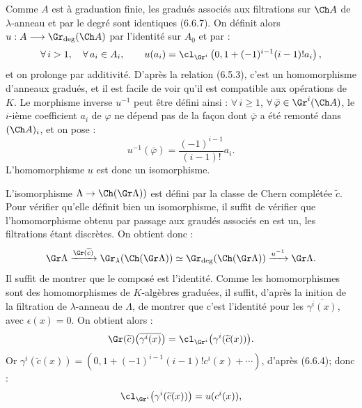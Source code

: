 
Comme \(A\) est à graduation finie, les gradués associés aux filtrations sur \(\Ch A\) de \(\lambda\)-anneau et par le degré sont identiques (6.6.7). On définit alors \(u:A\longrightarrow \Gr_{\deg}(\Ch A)\) par l'identité sur \(A_0\) et par :
\[
  \forall\, i>1,\quad\forall\, a_i\in A_i,\qquad u(a_i)=\cl_{\Gr^i}\left(0,1+(-1)^{i-1}(i-1)!a_i\right),
\]
et on prolonge par additivité. D'après la relation (6.5.3), c'est un homomorphisme d'anneaux gradués, et il est facile de voir qu'il est compatible aux opérations de \(K\). Le morphisme inverse \(u^{-1}\) peut être défini ainsi : \(\forall\, i\ge1\), \(\forall\,\bar\varphi\in\Gr^i(\Ch A)\), le \(i\)-ième coefficient \(a_i\) de \(\varphi\) ne dépend pas de la façon dont \(\bar\varphi\) a été remonté dans \((\Ch A)_i\), et on pose :
\[
  u^{-1}(\bar\varphi)=\frac{(-1)^{i-1}}{(i-1)!}a_i.
\]
L'homomorphisme \(u\) est donc un isomorphisme.

L'isomorphisme \(\Lambda\to\Ch(\Gr\Lambda))\) est défini par la classe de Chern complétée \(\widetilde c\). Pour vérifier qu'elle définit bien un isomorphisme, il suffit de vérifier que l'homomorphisme obtenu par passage aux graudés associés en est un, les filtrations étant discrètes. On obtient donc :
\[
  \Gr\Lambda
   \xrightarrow{\Gr(\widetilde c)}
  \Gr_{\lambda}(\Ch(\Gr\Lambda))
   \simeq
  \Gr_{\deg}(\Ch(\Gr\Lambda))
   \xrightarrow{u^{-1}}
  \Gr\Lambda .
\]
Il suffit de montrer que le composé est l'identité. Comme les homomorphismes sont des homomorphismes de \(K\)-algèbres graduées, il suffit, d'après la \hphantom{déf}inition de la filtration de \(\lambda\)-anneau de \(\Lambda\), de montrer que c'est l'identité pour les \(\overline{\gamma^i(x)}\), avec \(\epsilon(x)=0\). On obtient alors :
\[
  \Gr(\widetilde c)\bigl(\overline{\gamma^i(x)}\bigr)
  =
  \cl_{\Gr^i}\bigl(\gamma^i(\widetilde c(x))\bigr).
\]
Or \(\gamma^i(\widetilde c(x))=(0,1+(-1)^{i-1}(i-1)!c^i(x)+\cdots)\), d'après (6.6.4); donc :
\[
  \cl_{\Gr^i}\bigl(\gamma^i(\widetilde c(x))\bigr)=u(c^i(x)),
\]
